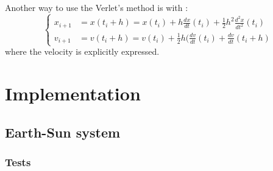 \documentclass[a4paper, twoside, 11pt]{report}
\theoremstyle{theorem}
\theoremstyle{remark}
\theoremstyle{exemple}
\begin{document}
            \paragraph{}Another way to use the Verlet's method is with :
                \begin{equation*}
                    \left\{
                        \begin{aligned}
                            x_{i+1}&=x(t_i+h) = x(t_i) + h\frac{dx}{dt}(t_i) + \frac{1}{2}h^2 \frac{d^2x}{dt^2}(t_i)\\
                            v_{i+1}&=v(t_i+h) = v(t_i) + \frac{1}{2}h(\frac{dv}{dt}(t_i) + \frac{dv}{dt}(t_i+h)
                        \end{aligned}
                    \right.
                \end{equation*}
            where the velocity is explicitly expressed.
            


\chapter{Implementation}

    \section{Earth-Sun system}
        \subsection{}
        
        \subsection{Tests}
\end{document}

